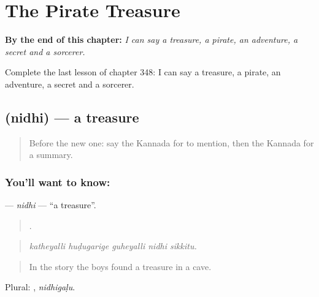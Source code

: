 
\chapter{The Pirate Treasure}
\label{ch:ka-the-pirate-treasure}

\begin{chapteropening}
\textbf{By the end of this chapter:} \emph{I can say a treasure, a pirate, an adventure, a secret and a sorcerer.}

Complete the last lesson of chapter 348: I can say a treasure, a pirate, an adventure, a secret and a sorcerer.
\end{chapteropening}

\section[\texorpdfstring{\kn{ನಿಧಿ} (nidhi)}{ನಿಧಿ (nidhi)}]{ (nidhi) — a treasure}

\label{lesson:KA-C348-nidhi}



\begin{quote}
Before the new one: say the Kannada for to mention, then the Kannada for a summary.
\end{quote}

\subsection*{You'll want to know: }
\textbf{} — \emph{nidhi} — \textquotedblleft{}a treasure\textquotedblright{}.

\begin{quote}
    .
\end{quote}

\begin{quote}
\emph{katheyalli huḍugarige guheyalli nidhi sikkitu.}
\end{quote}

\begin{quote}
In the story the boys found a treasure in a cave.
\end{quote}

Plural: , \emph{nidhigaḷu}.


